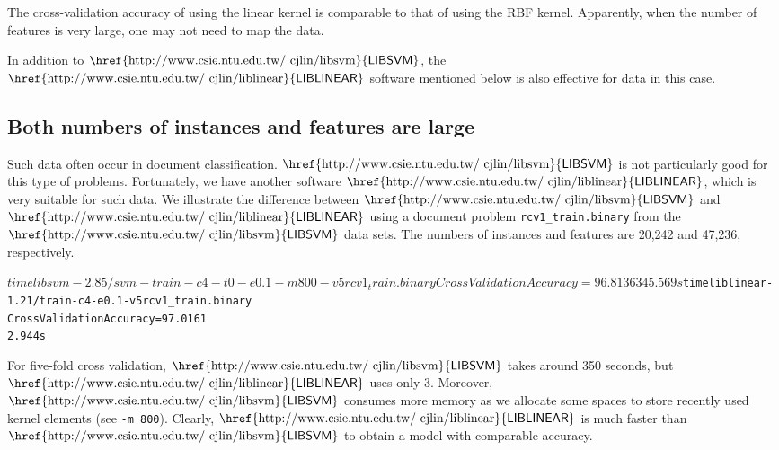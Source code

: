 \documentclass[12pt]{article}
\newcommand{\libsvm}{$\mbox{\href{http://www.csie.ntu.edu.tw/~cjlin/libsvm}{\sf LIBSVM}}$\xspace}
\newcommand{\liblinear}{$\mbox{\href{http://www.csie.ntu.edu.tw/~cjlin/liblinear}{\sf LIBLINEAR}}$\xspace}
\begin{document}
The cross-validation accuracy of using the linear kernel is comparable to that of using the
  RBF kernel. Apparently, when the number of
features is
very large, one may not need to map the data.

In addition to \libsvm, the \liblinear software
mentioned below is also effective for
data in this case.

\subsection{Both numbers of instances and features are
  large}

  Such data often occur in document classification. \libsvm is not
particularly good for this type of problems. Fortunately, we have another
  software \liblinear \citep{REF08a}, which is very suitable for such data. We
  illustrate the difference between \libsvm and \liblinear using a
  document problem
{\tt rcv1\_train.binary} from the \libsvm data sets.
The numbers of instances and features are
20,242 and 47,236, respectively.
\begin{alltt}$ time libsvm-2.85/svm-train -c 4 -t 0 -e 0.1 -m 800 -v 5 rcv1_train.binary
Cross Validation Accuracy = 96.8136%
345.569s
$ time liblinear-1.21/train -c 4 -e 0.1 -v 5 rcv1_train.binary
Cross Validation Accuracy = 97.0161%
2.944s
\end{alltt}
For five-fold cross validation,
\libsvm takes around 350 seconds, but
\liblinear uses only 3. Moreover,
\libsvm consumes more memory as we
allocate some spaces to store
recently used kernel elements
(see {\tt -m 800}).
Clearly,
\liblinear is much faster
than \libsvm to obtain a model with
comparable accuracy.
\end{document}
